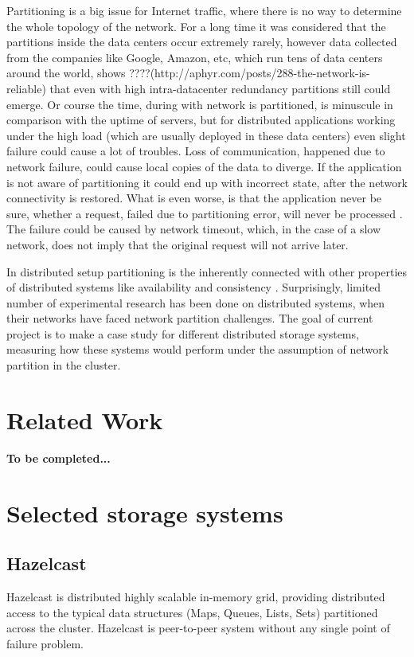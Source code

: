 \documentclass[a4paper]{article}
\begin{document}
Partitioning is a big issue for Internet traffic, where there is no way to determine the whole topology of the network.
For a long time it was considered that the partitions inside the data centers occur extremely rarely, however data collected from the companies like Google, Amazon, etc, which run tens of data centers around the world, shows ????(http://aphyr.com/posts/288-the-network-is-reliable) that even with high intra-datacenter redundancy partitions still could emerge.
Or course the time, during with network is partitioned, is minuscule in comparison with the uptime of servers, but for distributed applications working under the high load (which are usually deployed in these data centers) even slight failure could cause a lot of troubles.
Loss of communication, happened due to network failure, could cause local copies of the data to diverge.
If the application is not aware of partitioning it could end up with incorrect state, after the network connectivity is restored.
What is even worse, is that the application never be sure, whether a request, failed due to partitioning error, will never be processed . 
The failure could be caused by network timeout, which, in the case of a slow network, does not imply that the original request will not arrive later.

In distributed setup partitioning is the inherently connected with other properties of distributed systems like availability and consistency \cite{brewer2000towards}.
Surprisingly, limited number of experimental research has been done on distributed systems, when their networks have faced network partition challenges. 
The goal of current project is to make a case study for different distributed storage systems, measuring how these systems would perform under the assumption of network partition in the cluster.


\section{Related Work}

{\bf To be completed...}



\section{Selected storage systems}
\label{sec:candidates}

\subsection*{Hazelcast}
Hazelcast is distributed highly scalable in-memory grid, providing distributed access to the typical data structures (Maps, Queues, Lists, Sets) partitioned across the cluster. 
Hazelcast is peer-to-peer system without any single point of failure problem.
\end{document}
